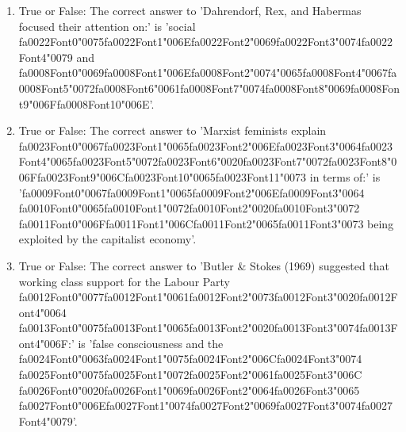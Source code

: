 \documentclass[12pt]{article}
\begin{document}
\begin{enumerate}[label=\arabic*.]
\item True or False: The correct answer to 'Dahrendorf, Rex, and Habermas focused their attention on:' is 'social {\csname fa0022Font0\endcsname\char"0075}{\csname fa0022Font1\endcsname\char"006E}{\csname fa0022Font2\endcsname\char"0069}{\csname fa0022Font3\endcsname\char"0074}{\csname fa0022Font4\endcsname\char"0079} and {\csname fa0008Font0\endcsname\char"0069}{\csname fa0008Font1\endcsname\char"006E}{\csname fa0008Font2\endcsname\char"0074}{\char"0065}{\csname fa0008Font4\endcsname\char"0067}{\csname fa0008Font5\endcsname\char"0072}{\csname fa0008Font6\endcsname\char"0061}{\csname fa0008Font7\endcsname\char"0074}{\csname fa0008Font8\endcsname\char"0069}{\csname fa0008Font9\endcsname\char"006F}{\csname fa0008Font10\endcsname\char"006E}'.
\item True or False: The correct answer to 'Marxist feminists explain {\csname fa0023Font0\endcsname\char"0067}{\csname fa0023Font1\endcsname\char"0065}{\csname fa0023Font2\endcsname\char"006E}{\csname fa0023Font3\endcsname\char"0064}{\csname fa0023Font4\endcsname\char"0065}{\csname fa0023Font5\endcsname\char"0072}{\csname fa0023Font6\endcsname\char"0020}{\csname fa0023Font7\endcsname\char"0072}{\csname fa0023Font8\endcsname\char"006F}{\csname fa0023Font9\endcsname\char"006C}{\csname fa0023Font10\endcsname\char"0065}{\csname fa0023Font11\endcsname\char"0073} in terms of:' is '{\csname fa0009Font0\endcsname\char"0067}{\csname fa0009Font1\endcsname\char"0065}{\csname fa0009Font2\endcsname\char"006E}{\csname fa0009Font3\endcsname\char"0064} {\csname fa0010Font0\endcsname\char"0065}{\csname fa0010Font1\endcsname\char"0072}{\csname fa0010Font2\endcsname\char"0020}{\csname fa0010Font3\endcsname\char"0072} {\csname fa0011Font0\endcsname\char"006F}{\csname fa0011Font1\endcsname\char"006C}{\csname fa0011Font2\endcsname\char"0065}{\csname fa0011Font3\endcsname\char"0073} being exploited by the capitalist economy'.
\item True or False: The correct answer to 'Butler \& Stokes (1969) suggested that working class support for the Labour Party {\csname fa0012Font0\endcsname\char"0077}{\csname fa0012Font1\endcsname\char"0061}{\csname fa0012Font2\endcsname\char"0073}{\csname fa0012Font3\endcsname\char"0020}{\csname fa0012Font4\endcsname\char"0064} {\csname fa0013Font0\endcsname\char"0075}{\csname fa0013Font1\endcsname\char"0065}{\csname fa0013Font2\endcsname\char"0020}{\csname fa0013Font3\endcsname\char"0074}{\csname fa0013Font4\endcsname\char"006F}:' is 'false consciousness and the {\csname fa0024Font0\endcsname\char"0063}{\csname fa0024Font1\endcsname\char"0075}{\csname fa0024Font2\endcsname\char"006C}{\csname fa0024Font3\endcsname\char"0074} {\csname fa0025Font0\endcsname\char"0075}{\csname fa0025Font1\endcsname\char"0072}{\csname fa0025Font2\endcsname\char"0061}{\csname fa0025Font3\endcsname\char"006C} {\csname fa0026Font0\endcsname\char"0020}{\csname fa0026Font1\endcsname\char"0069}{\csname fa0026Font2\endcsname\char"0064}{\csname fa0026Font3\endcsname\char"0065} {\csname fa0027Font0\endcsname\char"006E}{\csname fa0027Font1\endcsname\char"0074}{\csname fa0027Font2\endcsname\char"0069}{\csname fa0027Font3\endcsname\char"0074}{\csname fa0027Font4\endcsname\char"0079}'.

\end{enumerate}
\end{document}
